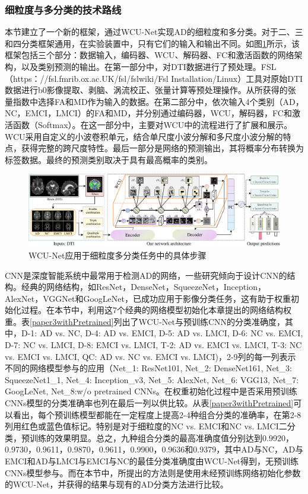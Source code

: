 \subsubsection{细粒度与多分类的技术路线}\label{4.3.3.2}
本节建立了一个新的框架，通过WCU-Net实现AD的细粒度和多分类。对于二、三和四分类框架通用，在实验装置中，只有它们的输入和输出不同。如图\ref{paper34classify}所示，该框架包括三个部分：数据输入，编码器、WCU、解码器、FC和激活函数的网络架构，以及类别预测的输出。在第一部分中，对DTI数据进行了预处理。FSL（https：//fsl.fmrib.ox.ac.UK/fsl/fslwiki/Fsl Installation/Linux）工具对原始DTI数据进行b0影像提取、剥脑、涡流校正、张量计算等预处理操作。从所获得的张量指数中选择FA和MD作为输入的数据。在第二部分中，依次输入4个类别（AD，NC，EMCI，LMCI）的FA和MD，并分别通过编码器，WCU，解码器，FC和激活函数（Softmax）。在这一部分中，主要对WCU中的流程进行了扩展和展示。WCU采用自定义的小波卷积单元，结合单尺度小波分解和多尺度小波分解的特点，获得完整的跨尺度特性。最后一部分是网络的预测输出，其将概率分布转换为标签数据。最终的预测类别取决于具有最高概率的类别。
    \begin{figure}[ht]
      \centering
      \includegraphics[width=0.9\linewidth]{figs/paper34classify.pdf}
      \caption{WCU-Net应用于细粒度多分类任务中的具体步骤} \label{paper34classify}
    \end{figure}


CNN是深度智能系统中最常用于检测AD的网络，一些研究倾向于设计CNN的结构\cite{bringas2020alzheimer}。经典的网络结构，如ResNet，DenseNet，SqueezeNet，Inception，AlexNet，VGGNet和GoogLeNet，已成功应用于影像分类任务\cite{ananda2021classification}，这有助于权重初始化过程。在本节中，利用这7个经典的网络模型初始化本章提出的网络结构权重。表\ref{paper3withPretrained}列出了WCU-Net与预训练CNN的分类准确度，其中，D-1: AD vs. NC, D-4: AD vs. EMCI, D-5: AD vs. LMCI, D-6: NC vs. EMCI, D-7: NC vs. LMCI, D-8: EMCI vs. LMCI, T-2: AD vs. EMCI vs. LMCI, T-3: NC vs. EMCI vs. LMCI, QC: AD vs. NC vs. EMCI vs. LMCI)，2-9列的每一列表示不同的网络模型参与的应用（Net\_1: ResNet101, Net\_2: DenseNet161, Net\_3: SqueezeNet1\_1, Net\_4: Inception\_v3, Net\_5: AlexNet, Net\_6: VGG13, Net\_7: GoogLeNet, Net\_8:w/o pretrained CNNs。在权重初始化过程中是否采用预训练CNNs模型的分类准确率也列在最后一列以供比较。从表\ref{paper3withPretrained}可以看出，每个预训练模型都能在一定程度上提高2-4种组合分类的准确率，在第2-8列用红色或蓝色值标记。特别是对于细粒度的NC vs. EMCI和NC vs. LMCI二分类，预训练的效果明显。总之，九种组合分类的最高准确度值分别达到0.9920，0.9730，0.9611，0.9870，0.9611，0.9900，0.9636和0.9379，其中AD与NC，AD与EMCI和AD与LMCI与EMCI与NC的最佳分类准确度由WCU-Net得到，无预训练CNNs模型参与。而在本节中，所提出的方法则是使用未经预训练网络初始化参数的WCU-Net，并获得的结果与现有的AD分类方法进行比较。

